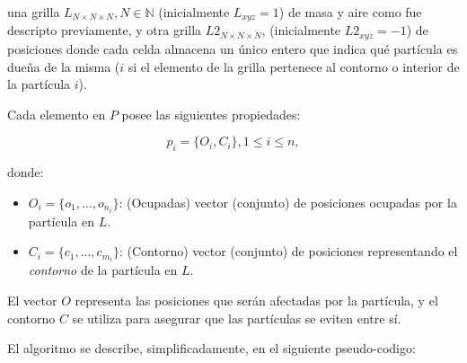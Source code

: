 \documentclass[oneside,a4paper,spanish,links]{amca}
\begin{document}
\noindent una grilla $L_{N\times N \times N}, N \in \mathbb{N} $ (inicialmente $L_{xyz}=1$) de masa y aire como fue descripto previamente, y otra grilla $L2_{N\times N \times N}$, (inicialmente $L2_{xyz}=-1$) de posiciones donde cada celda almacena un único entero que indica qu\'e part\'icula es due\~na de la misma ($i$ si el elemento de la grilla pertenece al contorno o interior de la part\'icula $i$).

Cada elemento en $P$ posee las siguientes propiedades:

\begin{equation}
  p_{i} = \{O_{i}, C_{i}\}, 1 \le i \le n,
\end{equation}

\noindent donde:

\begin{itemize}
\item $O_{i} = \{o_{1}, ... , o_{n_{i}}\}$: (Ocupadas) vector (conjunto) de posiciones ocupadas por la part\'icula en $L$.

\item $C_{i} = \{c_{1}, ... , c_{m_{i}}\}$: (Contorno) vector (conjunto) de posiciones representando el {\em contorno} de la part\'icula en $L$.
\end{itemize}

El vector $O$ representa las posiciones que ser\'an afectadas por la part\'icula, y el contorno $C$ se utiliza para asegurar que las part\'iculas se eviten entre s\'i.

El algoritmo se describe, simplificadamente, en el siguiente pseudo-codigo: 
\end{document}
